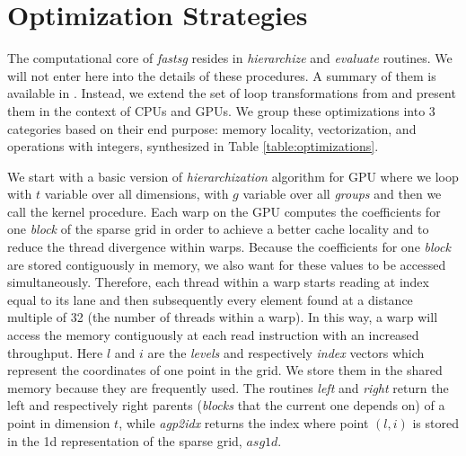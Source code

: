 \section{Optimization Strategies}
\label{sec:op_strategies}

The computational core of \textit{fastsg} resides in \textit{hierarchize} and
\textit{evaluate} routines. We will not enter here into the details of these
procedures. A summary of them is available in
\cite{Murarasu:2011:CDS:1941553.1941559}.
Instead, we extend the set of loop transformations from \cite{murarasu12fastsg:} and
present them in the context of CPUs and GPUs. We group these optimizations into
3 categories based on their end purpose: memory locality, vectorization, and
operations with integers, synthesized in Table \ref{table:optimizations}.

We start with a basic version of \textit{hierarchization} algorithm for GPU
where we loop with $t$ variable over all dimensions, with $g$ variable over all
\textit{groups} and then we call the kernel procedure. Each warp on the GPU
computes the coefficients for one \textit{block} of the sparse grid in order to
achieve a better cache locality and to reduce the thread divergence within
warps. Because the coefficients for one \textit{block} are stored contiguously
in memory, we also want for these values to be accessed simultaneously.
Therefore, each thread within a warp starts reading at index equal to its lane
and then subsequently every element found at a distance multiple of 32 (the
number of threads within a warp). In this way, a warp will access the memory
contiguously at each read instruction with an increased throughput. Here $l$ and
$i$ are the \textit{levels} and respectively \textit{index} vectors which
represent the coordinates of one point in the grid. We store them in the shared
memory because they are frequently used. The routines \textit{left} and
\textit{right} return the left and respectively right parents (\textit{blocks}
that the current one depends on) of a point in dimension $t$, while
\textit{agp2idx} returns the index where point $(l, i)$ is stored in the 1d
representation of the sparse grid, $asg1d$.

